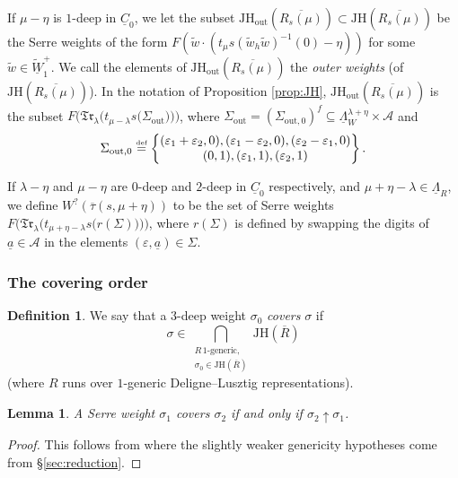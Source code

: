 \documentclass[oneside,a4paper,english, 11pt]{amsart}
\theoremstyle{plain}
\theoremstyle{plain}
\theoremstyle{plain}
\newtheorem{lemma}[thm]{Lemma}
\theoremstyle{plain}
\theoremstyle{plain}
\theoremstyle{plain}
\theoremstyle{definition}
\newtheorem{defn}[thm]{Definition}
\theoremstyle{definition}
\theoremstyle{definition}
\theoremstyle{remark}
\numberwithin{equation}{section}
\newcommand{\cA}{\mathcal{A}}
\newcommand{\eps}{\varepsilon}
\newcommand{\un}[1]{\underline{#1}}
\newcommand{\tld}[1]{\widetilde{#1}}
\newcommand{\JH}{\mathrm{JH}}
\newcommand{\taubar}{\overline{\tau}}
\newcommand{\defeq}{\stackrel{\textrm{\tiny{def}}}{=}}
\newcommand{\ovl}[1]{\overline{#1}}
\begin{document}
If $\mu-\eta$ is $1$-deep in $\un{C}_0$, we let the subset $\JH_{\mathrm{out}}(\ovl{R_s(\mu)})\subset\JH(\ovl{R_s(\mu)})$ be the Serre weights of the form $F(\tld{w} \cdot (t_\mu s (\tld{w}_h\tld{w})^{-1}(0) - \eta))$ for some $\tld{w} \in  \tld{\un{W}}_1^+$. 
We call the elements of $\JH_{\mathrm{out}}(\ovl{R_s(\mu)})$ the \emph{outer weights} (of $\JH(\ovl{R_s(\mu)})$). 
In the notation of Proposition \ref{prop:JH}, $\JH_{\mathrm{out}}(\ovl{R_s(\mu)})$ is the subset $F\Big(\mathfrak{Tr}_{\lambda}\big(t_{\mu-\lambda}s\big(\Sigma_{\mathrm{out}}\big)\big)\Big)$, where $\Sigma_{\mathrm{out}}=(\Sigma_{\mathrm{out},0})^{f}\subseteq \un{\Lambda}^{\lambda+\eta}_W\times\mathcal{A}$ and
%
\[
\Sigma_{\mathrm{out},0} \defeq  \begin{Bmatrix} (\eps_1+ \eps_2, 0), (\eps_1 - \eps_2, 0), (\eps_2 - \eps_1, 0) \\
 (0, 1) , (\eps_1, 1), (\eps_2, 1) 
 \end{Bmatrix}.
 \]

If $\lambda-\eta$ and $\mu-\eta$ are $0$-deep and $2$-deep in $\un{C}_0$ respectively, and $\mu+\eta-\lambda \in \un{\Lambda}_R$, we define $W^?(\taubar(s,\mu+\eta))$ to be the set of Serre weights $F\Big(\mathfrak{Tr}_{\lambda}\Big(t_{{\mu+\eta-\lambda}}s\big(r(\Sigma)\big)\Big)\Big)$, where $r(\Sigma)$ is defined by swapping the digits of $\un{a}\in\cA$ in the elements $(\eps,\un{a})\in\Sigma$.
%
%
%
%

%

\subsubsection{The covering order}
\label{subsub:CO}
\begin{defn}\label{defn:cover}
We say that a $3$-deep weight $\sigma_0$ \emph{covers} $\sigma$ if 
\[
\sigma \in \underset{\substack{R \, 1\textrm{-generic}, \\ \sigma_0 \in \JH(\overline{R})}}{\bigcap} \JH(\overline{R})
\]
(where $R$ runs over $1$-generic Deligne--Lusztig representations).
\end{defn}

\begin{lemma}\label{lemma:coverup}
A Serre weight $\sigma_1$ covers $\sigma_2$ if and only if $\sigma_2 \uparrow \sigma_1$.
\end{lemma}
\begin{proof}
This follows from \cite[Proposition 2.3.12(4)]{MLM} where the slightly weaker genericity hypotheses come from \S \ref{sec:reduction}.
\end{proof}
\end{document}
